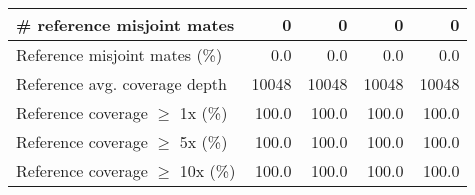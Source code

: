 \documentclass[12pt,a4paper]{article}
\begin{document}
\begin{table}[ht]
\begin{center}
\begin{tabular}{|l*{4}{|r}|}
\# reference misjoint mates & 0 & 0 & 0 & 0 \\ \hline
Reference misjoint mates (\%) & 0.0 & 0.0 & 0.0 & 0.0 \\ \hline
Reference avg. coverage depth & 10048 & 10048 & 10048 & 10048 \\ \hline
Reference coverage $\geq$ 1x (\%) & 100.0 & 100.0 & 100.0 & 100.0 \\ \hline
Reference coverage $\geq$ 5x (\%) & 100.0 & 100.0 & 100.0 & 100.0 \\ \hline
Reference coverage $\geq$ 10x (\%) & 100.0 & 100.0 & 100.0 & 100.0 \\ \hline
\end{tabular}
\end{center}
\end{table}
\end{document}
